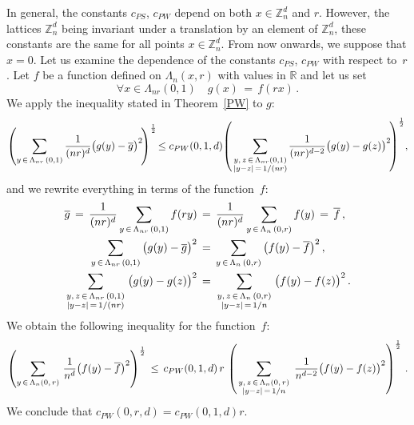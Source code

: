 \documentclass[10pt]{amsart}
\theoremstyle{definition}\newtheorem{defi}[theo]{Definition}\newtheorem{rema}[theo]{Remark}\newtheorem{exam}[theo]{Example}\newtheorem{exem}[theo]{Example}\newtheorem{nota}[theo]{Notation}
\newcommand{\tatop}[2]{\genfrac{}{}{0pt}{1}{#1}{#2}}
\newcommand*\Znd {{\mathbb Z_n^d}}
\newcommand*\R{\mathbb{R}}
\newcommand*\baf {{\overline f}}
\newcommand*\bag {{\overline g}}
\newcommand*\La {{\Lambda}}
\let\oldforall\forall
\renewcommand*{\forall}{\mathrel{\oldforall}}
\begin{document}
In general, the constants $c_{PS}$, $c_{PW}$ depend on both $x\in\Znd$ and $r$. However, the lattices $\Znd$ being invariant under a translation by an element of $\Znd$, these constants are the same for all points $x\in\Znd$. From now onwards, we suppose that $x=0$. Let us examine the dependence of the constants $c_{PS}$, $c_{PW}$ with respect to~$r$. Let $f$ be a function defined on $\La_n(x,r)$ with values in $\R$ and let us set
\[
\forall x\in\La_{nr}(0,1)\quad g(x)\,=\,f(rx)\,.
\]
We apply the inequality stated in Theorem~\ref{PW} to $g$:
\[
\left(\sum_{y\,\in\,\Lambda_{nr}\,(0,1)}\frac{1}{(nr)^d}\big(g(y)-\bag\big)^{2}\!\right)^{\frac{1}{2}}\!
\leq c_{PW}(0,1,d)\!\left(
\sum_{\tatop{y,\,z\,\in\,\Lambda_{nr}(0,1)}{|y-z|\,=\,1/(nr)}}\!
\frac{1}{(nr)^{d-2}}\big(g(y)-g(z)\big)^{2}\!\right)^{\frac{1}{2}}\!,
\]
and we rewrite everything in terms of the function~$f$:
\begin{align*}
\bag\,=\,
\frac{1}{(nr)^d}
\sum_{y\,\in\,\Lambda_{nr}\,(0,1)} f(ry)\,&=\,
\frac{1}{(nr)^d}
\sum_{y\,\in\,\Lambda_{n}\,(0,r)} f(y)\,=\,\baf\,,
\\
\sum_{y\,\in\,\Lambda_{nr}\,(0,1)}\big(g(y)-\bag\big)^{2}\,&=\,
\sum_{y\,\in\,\Lambda_{n}\,(0,r)}\big(f(y)-\baf\big)^{2}\,,
\\
\sum_{\tatop{y,\,z\,\in\,\Lambda_{nr}\,(0,1)}{|y-z|\,=\,1/(nr)}}
\big(g(y)-g(z)\big)^{2}\,&=\,
\sum_{\tatop{y,\,z\,\in\,\Lambda_{n}\,(0,r)}{|y-z|\,=\,1/n}}
\big(f(y)-f(z)\big)^{2}\,.
\end{align*}
We obtain the following inequality for the function~$f$:
\[
\left(\sum_{y\,\in\,\Lambda_{n}(0,\,r)}\,\frac{1}{n^d}\big(f(y)-\baf\big)^{2}\right)^{\frac{1}{2}}
\,\leq\, c_{PW}(0,1,d)\,r\,\left(
\sum_{\tatop{y,\,z\,\in\,\Lambda_{n}(0,\,r)}{|y-z|\,=\,1/n}}\,
\frac{1}{n^{d-2}}\big(f(y)-f(z)\big)^{2}\right)^{\frac{1}{2}}\,.
\]
We conclude that $c_{PW}(0,r,d)= c_{PW}(0,1,d)r$.


\addtocounter{section}{2}
\end{document}
